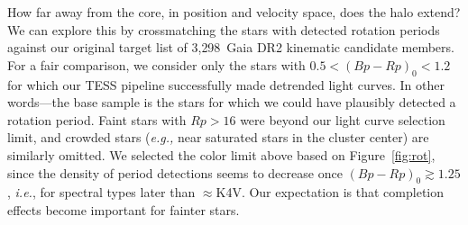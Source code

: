 \documentclass[12pt,twocolumn,tighten]{aastex63}
\newcommand{\nkinematic}{3{,}298\ } %
\newcommand{\kms}{\,km\,s$^{-1}$}
\begin{document}

How far away from the core, in position and velocity space, does the
halo extend?  We can explore this by crossmatching the stars with
detected rotation periods against our original target list of
\nkinematic Gaia DR2 kinematic candidate members.  For a fair
comparison, we consider only the stars with $0.5<(Bp-Rp)_0<1.2$ for
which our TESS pipeline successfully made detrended light curves.  In
other words---the base sample is the stars for which we could have
plausibly detected a rotation period.  Faint stars with $Rp>16$ were
beyond our light curve selection limit, and crowded stars ({\it e.g.,}
near saturated stars in the cluster center) are similarly omitted.  We
selected the color limit above based on Figure~\ref{fig:rot}, since
the density of period detections seems to decrease once $(Bp-Rp)_0
\gtrsim 1.25$, {\it i.e.}, for spectral types later than $\approx$K4V.
Our expectation is that completion effects become important for
fainter stars.

%
\end{document}

